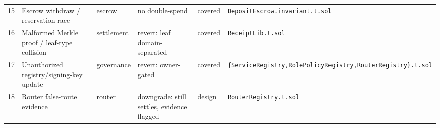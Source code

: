 \begin{table}[t]
\begin{tabular}{rlllll}
15 & Escrow withdraw / reservation race & escrow & no double-spend & covered & \texttt{DepositEscrow.invariant.t.sol} \\
16 & Malformed Merkle proof / leaf-type collision & settlement & revert: leaf domain-separated & covered & \texttt{ReceiptLib.t.sol} \\
17 & Unauthorized registry/signing-key update & governance & revert: owner-gated & covered & \texttt{\{ServiceRegistry,RolePolicyRegistry,RouterRegistry\}.t.sol} \\
18 & Router false-route evidence & router & downgrade: still settles, evidence flagged & design & \texttt{RouterRegistry.t.sol} \\
\hline
\end{tabular}
\end{table}
